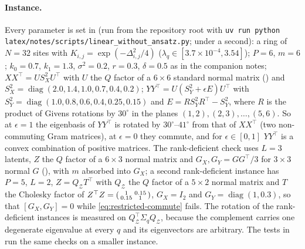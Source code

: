 \documentclass[11pt,a4paper]{article}
\newcommand{\diag}{\operatorname{diag}}
\newcommand{\Z}{\mathcal Z}
\begin{document}
\paragraph{Instance.}
Every parameter is set in  (run from the repository root with \texttt{uv run python latex/notes/scripts/linear\_without\_ansatz.py}; under a second): a ring of $N = 32$ sites with $K_{i,j} = \exp(-\Delta_{i,j}^2/4)$ ($\lambda_q \in [3.7\times10^{-4}, 3.54]$); $P = 6$, $m = 6$; $k_0 = 0.7$, $k_1 = 1.3$, $\sigma^2 = 0.2$, $r = 0.3$, $\delta = 0.5$ as in the companion notes; $XX^\top = U S_X^2U^\top$ with $U$ the $Q$ factor of a $6\times6$ standard normal matrix () and $S_X^2 = \diag(2.0, 1.4, 1.0, 0.7, 0.4, 0.2)$; $YY^\top = U(S_Y^2 + \epsilon E)U^\top$ with $S_Y^2 = \diag(1.0, 0.8, 0.6, 0.4, 0.25, 0.15)$ and $E = RS_Y^2R^\top - S_Y^2$, where $R$ is the product of Givens rotations by $30^\circ$ in the planes $(1,2),(2,3),\dots,(5,6)$. So at $\epsilon = 1$ the eigenbasis of $YY^\top$ is rotated by $30^\circ$--$41^\circ$ from that of $XX^\top$ (two non-commuting Gram matrices), at $\epsilon = 0$ they commute, and for $\epsilon\in[0,1]$ $YY^\top$ is a convex combination of positive matrices. The rank-deficient check uses $L = 3$ latents, $Z$ the $Q$ factor of a $6\times3$ normal matrix and $G_X, G_Y = GG^\top/3$ for $3\times3$ normal $G$ (), with $m$ absorbed into $G_X$; a second rank-deficient instance has $P = 5$, $L = 2$, $Z = Q_\Z T^\top$ with $Q_\Z$ the $Q$ factor of a $5\times2$ normal matrix and $T$ the Cholesky factor of $Z^\top Z = \begin{psmallmatrix}1 & 0.15\\ 0.15 & 1\end{psmallmatrix}$, $G_X = I_2$ and $G_Y = \diag(1, 0.3)$, so that $[G_X, G_Y] = 0$ while \eqref{eq:restricted-commute} fails. The rotation of the rank-deficient instances is measured on $Q_\Z^\top\Sigma_qQ_\Z$, because the complement carries one degenerate eigenvalue at every $q$ and its eigenvectors are arbitrary. The tests in  run the same checks on a smaller instance.
\end{document}
